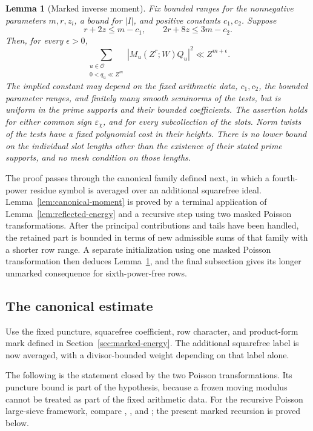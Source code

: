 \documentclass[11pt,a4paper]{article}
\numberwithin{equation}{section}
\numberwithin{figure}{section}
\newtheorem{lemma}[theorem]{Lemma}
\theoremstyle{definition}
\theoremstyle{remark}
\begin{document}
\begin{lemma}[Marked inverse moment]\label{lem:marked}
Fix bounded ranges for the nonnegative parameters \(m,r,z_i\), a bound
for \(|I|\), and positive constants \(c_1,c_2\).  Suppose
\[
 r+2z\le m-c_1,\qquad 2r+8z\le3m-c_2.
\]
Then, for every \(\epsilon>0\),
\begin{equation}\label{old-eq:4.1}
 \sum_{\substack{u\in\mathcal O\\0<q_u\ll Z^m}}
       |M_u(Z^r;W)Q_u|^2\ll Z^{m+\epsilon}.
\end{equation}
The implied constant may depend on the fixed arithmetic data, \(c_1,c_2\),
the bounded parameter ranges, and finitely many smooth seminorms of the
tests, but is uniform in the prime supports and their bounded coefficients.
The assertion holds for either common sign \(\varepsilon_\chi\), and for
every subcollection of the slots.  Norm twists of the tests have a fixed
polynomial cost in their heights.  There is no lower bound on the individual
slot lengths other than the existence of their stated prime supports, and
no mesh condition on those lengths.
\end{lemma}

The proof passes through the canonical family defined next, in which a
fourth-power residue symbol is averaged over an additional squarefree
ideal.  Lemma~\ref{lem:canonical-moment} is proved by a terminal application
of Lemma~\ref{lem:reflected-energy} and a recursive step using two masked
Poisson transformations.  After the principal contributions and tails have
been handled, the retained part is bounded in terms of new admissible sums
of that family with a shorter row range.  A separate initialization using
one masked Poisson transformation then deduces Lemma~\ref{lem:marked}, and
the final subsection gives its longer unmarked consequence for
sixth-power-free rows.

\subsection{The canonical estimate}

Use the fixed puncture, squarefree coefficient, row character, and
product-form mark defined in Section~\ref{sec:marked-energy}. The additional
squarefree label is now averaged, with a divisor-bounded weight depending
on that label alone.

The following is the statement closed by the two Poisson transformations.
Its puncture bound is part of the hypothesis, because a frozen moving
modulus cannot be treated as part of the fixed arithmetic data.
For the recursive Poisson large-sieve framework, compare
\cite[Section~2]{HBQuadratic}, \cite[Section~4]{HB}, and
\cite[Sections~4--7]{GL}; the present marked recursion is proved below.
\end{document}
